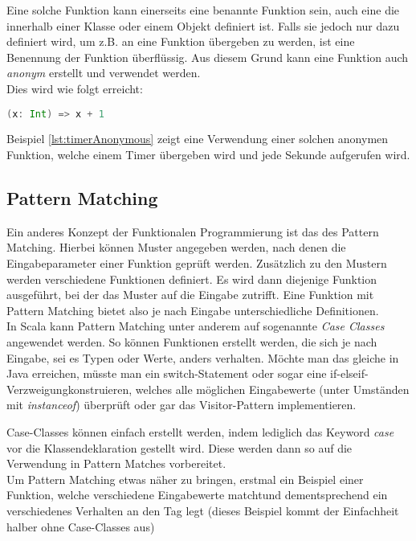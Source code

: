 Eine solche Funktion kann einerseits eine benannte Funktion sein, auch
eine die innerhalb einer Klasse oder einem Objekt definiert ist.  Falls
sie jedoch nur dazu definiert wird, um z.B. an eine Funktion übergeben
zu werden, ist eine Benennung der Funktion überflüssig. Aus diesem Grund
kann eine Funktion auch \emph{anonym} erstellt und verwendet werden.\\

Dies wird wie folgt erreicht: 

\begin{lstlisting}[float=ht,language=scala,caption=Anonyme Funktion,label=lst:anonymousFunction]
(x: Int) => x + 1
\end{lstlisting}

Beispiel \ref{lst:timerAnonymous} zeigt eine Verwendung einer solchen 
anonymen Funktion, welche einem Timer übergeben wird und jede Sekunde
aufgerufen wird. \\

\subsection{Pattern Matching}
\label{sec:patternMatching}

Ein anderes Konzept der Funktionalen Programmierung ist das des Pattern
Matching. Hierbei können Muster angegeben werden, nach denen die
Eingabeparameter einer Funktion geprüft werden. Zusätzlich zu den
Mustern werden verschiedene Funktionen definiert. Es wird dann diejenige
Funktion ausgeführt, bei der das Muster auf die Eingabe zutrifft. Eine
Funktion mit Pattern Matching bietet also je nach Eingabe unterschiedliche
Definitionen. \\

In Scala kann Pattern Matching unter anderem auf sogenannte \emph{Case
Classes} angewendet werden. So können Funktionen erstellt werden, die
sich je nach Eingabe, sei es Typen oder Werte, anders verhalten.  Möchte
man das gleiche in Java erreichen, müsste man ein switch-Statement
oder sogar eine \glqq if-elseif-Verzweigung\grqq konstruieren, welches
alle möglichen Eingabewerte (unter Umständen mit \emph{instanceof})
überprüft oder gar das Visitor-Pattern implementieren.

Case-Classes können einfach erstellt werden, indem lediglich das Keyword
\emph{case} vor die Klassendeklaration gestellt wird. Diese werden
dann so auf die Verwendung in Pattern Matches \qlqq vorbereitet\grqq.\\

Um Pattern Matching etwas näher zu bringen, erstmal ein Beispiel einer
Funktion, welche verschiedene Eingabewerte \glqq matcht\grqq und dementsprechend
ein verschiedenes Verhalten an den Tag legt (dieses Beispiel kommt der 
Einfachheit halber ohne Case-Classes aus)

